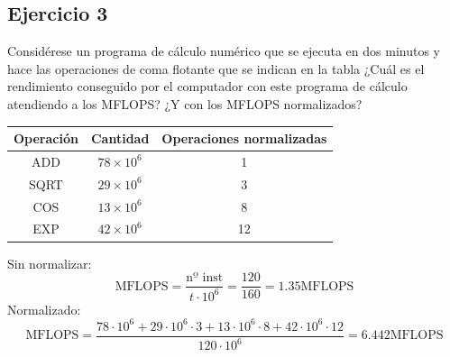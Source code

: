 \subsection{Ejercicio 3}
\noindent
Considérese un programa de cálculo numérico que se ejecuta en dos minutos y hace las operaciones de coma flotante que se indican en la tabla ¿Cuál es el rendimiento conseguido por el computador con este programa de cálculo atendiendo a los MFLOPS? ¿Y con los MFLOPS normalizados?
\begin{table}[H]
\centering
\begin{tabular}{|c|c|c|}
\hline
\textbf{Operación} & \textbf{Cantidad} & \textbf{Operaciones normalizadas} \\ \hline
ADD                & $78\times10^6$            & 1                                 \\ \hline
SQRT               & $29\times10^6$            & 3                                 \\ \hline
COS                & $13\times10^6$            & 8                                 \\ \hline
EXP                & $42\times10^6$            & 12                                \\ \hline
\end{tabular}
\end{table}
\begin{tcolorbox}[colback=white,colframe=cyan!50!black,fonttitle=\bfseries]
Sin normalizar:
\[
\text{MFLOPS}=\dfrac{\text{nº inst}}{t\cdot 10^6}=\dfrac{120}{160}=1.35\text{MFLOPS}
\]
Normalizado:
\[
\text{MFLOPS}=\dfrac{78\cdot 10^6+29\cdot 10^6\cdot 3+13\cdot 10^6\cdot 8+42\cdot 10^6\cdot 12}{120\cdot 10^6}=6.442\text{MFLOPS}
\]
\end{tcolorbox}
